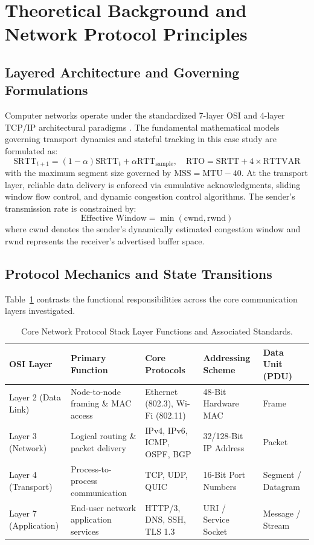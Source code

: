\section{Theoretical Background and Network Protocol Principles}

\subsection{Layered Architecture and Governing Formulations}
Computer networks operate under the standardized 7-layer OSI and 4-layer TCP/IP architectural paradigms \cite{stallings2017data}. The fundamental mathematical models governing transport dynamics and stateful tracking in this case study are formulated as:
\begin{equation}
  \text{SRTT}_{t+1} = (1 - \alpha) \text{SRTT}_t + \alpha \text{RTT}_{\text{sample}}, \quad \text{RTO} = \text{SRTT} + 4 \times \text{RTTVAR}
\label{eq:core_math}
\end{equation}
with the maximum segment size governed by $\text{MSS} = \text{MTU} - 40$.
At the transport layer, reliable data delivery is enforced via cumulative acknowledgments, sliding window flow control, and dynamic congestion control algorithms. The sender's transmission rate is constrained by:
\begin{equation}
  \text{Effective Window} = \min(\text{cwnd}, \text{rwnd})
\end{equation}
where $\text{cwnd}$ denotes the sender's dynamically estimated congestion window and $\text{rwnd}$ represents the receiver's advertised buffer space.

\subsection{Protocol Mechanics and State Transitions}
Table~\ref{tab:layer_comp} contrasts the functional responsibilities across the core communication layers investigated.
\begin{table}[H]
\centering
\caption{Core Network Protocol Stack Layer Functions and Associated Standards.}
\label{tab:layer_comp}
\begin{tabularx}{\linewidth}{lXXXX}
\toprule
\textbf{OSI Layer} & \textbf{Primary Function} & \textbf{Core Protocols} & \textbf{Addressing Scheme} & \textbf{Data Unit (PDU)} \\
\midrule
Layer 2 (Data Link) & Node-to-node framing \& MAC access & Ethernet (802.3), Wi-Fi (802.11) & 48-Bit Hardware MAC & Frame \\
Layer 3 (Network) & Logical routing \& packet delivery & IPv4, IPv6, ICMP, OSPF, BGP & 32/128-Bit IP Address & Packet \\
Layer 4 (Transport) & Process-to-process communication & TCP, UDP, QUIC & 16-Bit Port Numbers & Segment / Datagram \\
Layer 7 (Application) & End-user network application services & HTTP/3, DNS, SSH, TLS 1.3 & URI / Service Socket & Message / Stream \\
\bottomrule
\end{tabularx}
\end{table}

